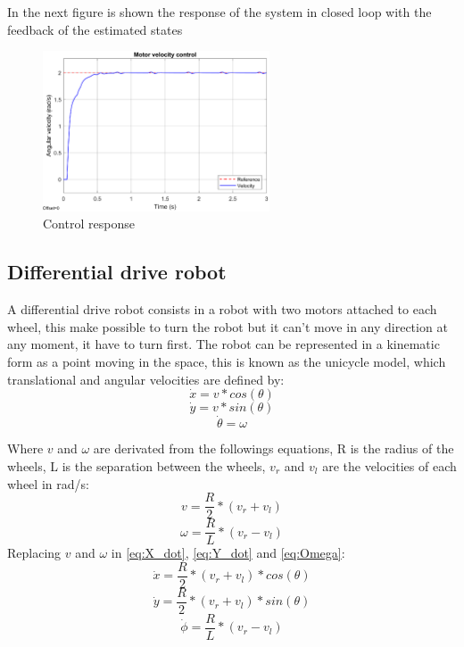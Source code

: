 In the next figure is shown the response of the system in closed loop with the feedback of the estimated states

\begin{figure}[h!]
    \centering
 	\includegraphics[trim=0 0 0 0,clip,width=0.6\textwidth]{Figs/Control_motor.eps}
    \caption{Control response}
    \label{fig:Speed_Control_response}
\end{figure}




\newpage
\subsection{Differential drive robot}
A differential drive robot consists in a robot with two motors attached to each wheel, this make possible to turn the robot but it can't move in any direction at any moment, it have to turn first. The robot can be represented in a kinematic form as a point moving in the space, this is known as the unicycle model, which translational and angular velocities are defined by:
\begin{equation}
    \dot{x}=v*cos(\theta)
\label{eq:X_dot}
\end{equation}
\begin{equation}
    \dot{y}=v*sin(\theta)
\label{eq:Y_dot}
\end{equation}
\begin{equation}
    \dot{\theta}=\omega
\label{eq:Omega}
\end{equation}


Where $v$ and $\omega$ are derivated from the followings equations, R is the radius of the wheels, L is the separation between the wheels, $v_{r}$ and $v_{l}$ are the velocities of each wheel in rad/s:
\[v=\frac{R}{2}*(v_r+v_l)\]
\[\omega=\frac{R}{L}*(v_r-v_l)\]
Replacing $v$ and $\omega$ in \autoref{eq:X_dot}, \autoref{eq:Y_dot} and \autoref{eq:Omega}:
\[\dot{x}=\frac{R}{2}*(v_r+v_l)*cos(\theta)\]
\[\dot{y}=\frac{R}{2}*(v_r+v_l)*sin(\theta)\]
\[\dot{\phi}=\frac{R}{L}*(v_r-v_l)\]






